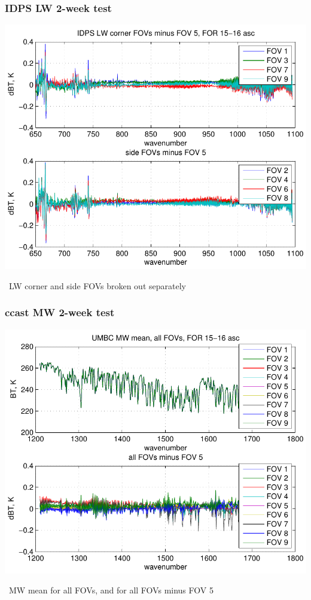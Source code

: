 \documentclass[11pt]{beamer}
\begin{document}
\begin{frame}
\frametitle{IDPS LW 2-week test}

\begin{center}
  \includegraphics[scale=0.6]{idps_LW_dif_5-18_Mar.pdf}
\end{center}

\idps\ LW corner and side FOVs broken out separately

\end{frame}
\begin{frame}
\frametitle{ccast MW 2-week test}

\begin{center}
  \includegraphics[scale=0.6]{umbc_MW_avg_5-18_Mar.pdf}
\end{center}

\ccast\ MW mean for all FOVs, and for all FOVs minus FOV 5

\end{frame}
\end{document}

